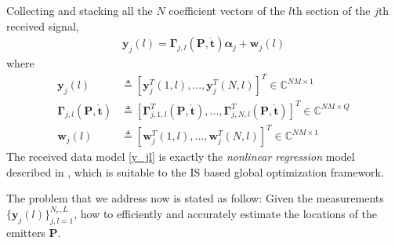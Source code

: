 \documentclass[review]{elsarticle}
\begin{document}
Collecting and stacking all the $N$ coefficient vectors of the $l$th section of the $j$th received signal,
\begin{align}\label{y_jl}
    \boldsymbol{y}_j(l)=\boldsymbol{\Gamma}_{j,l}(\boldsymbol{P},\mathring{\boldsymbol{t}})\boldsymbol{\alpha}_j+\boldsymbol{w}_j(l)
\end{align}
where
\begin{align}\label{Gammajl}
    \boldsymbol{y}_j(l)&\triangleq[\boldsymbol{y}_j^T(1,l),...,\boldsymbol{y}_j^T(N,l)]^T\in \mathbb{C}^{NM\times 1}\\ \nonumber
    \boldsymbol{\Gamma}_{j,l}(\boldsymbol{P},\mathring{\boldsymbol{t}})&\triangleq[\boldsymbol{\Gamma}_{j,1,l}^T(\boldsymbol{P},\mathring{\boldsymbol{t}}),...,\boldsymbol{\Gamma}_{j,N,l}^T(\boldsymbol{P},\mathring{\boldsymbol{t}})]^T\in \mathbb{C}^{NM\times Q}\\ 
    \boldsymbol{w}_j(l)&\triangleq[\boldsymbol{w}_j^T(1,l),...,\boldsymbol{w}_j^T(N,l)]^T\in \mathbb{C}^{NM\times 1}\nonumber
\end{align}
The received data model \eqref{y_jl} is exactly the \emph{nonlinear regression} model described in \cite{Kay2000Mean}, which is suitable to the IS based global optimization framework.

The problem that we address now is stated as follow: Given the measurements $\lbrace\boldsymbol{y}_j(l)\rbrace_{j,l=1}^{N_r,L}$, how to efficiently and accurately estimate the locations of the emitters $\boldsymbol{P}$.
\end{document}
